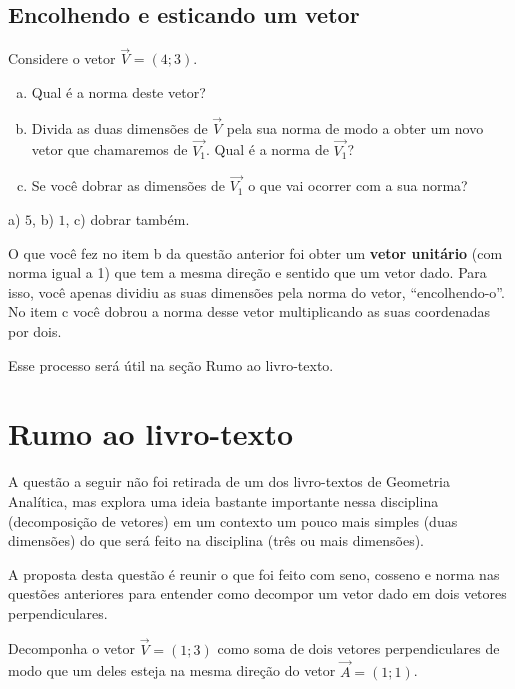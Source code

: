 \documentclass[main.tex]{subfiles}
\begin{document}
\subsection*{Encolhendo e esticando um vetor}

\begin{questao}
Considere o vetor $\overrightarrow{V}=(4;3)$.
\begin{enumerate}[a)]
\item Qual é a norma deste vetor?
\item Divida as duas dimensões de $\overrightarrow{V}$ pela sua norma de modo a obter um novo vetor que chamaremos de $\overrightarrow{V_1}$. Qual é a norma de $\overrightarrow{V_1}$?
\item Se você dobrar as dimensões de $\overrightarrow{V_1}$ o que vai ocorrer com a sua norma?
\end{enumerate}
\end{questao}

\begin{gabarito}
	\begin{gabaritoQuestao}
		a) $5$, b) $1$, c) dobrar também.
	\end{gabaritoQuestao}
\end{gabarito}

O que você fez no item b da questão anterior foi obter um \textbf{vetor unitário} (com norma igual a 1) que tem a mesma direção e sentido que um vetor dado. Para isso, você apenas dividiu as suas dimensões pela norma do vetor, ``encolhendo-o''. No item c você dobrou a norma desse vetor multiplicando as suas coordenadas por dois.

Esse processo será útil na seção Rumo ao livro-texto.

\section{Rumo ao livro-texto}

A questão a seguir não foi retirada de um dos livro-textos de Geometria Analítica, mas explora uma ideia bastante importante nessa disciplina (decomposição de vetores) em um contexto um pouco mais simples (duas dimensões) do que será feito na disciplina (três ou mais dimensões).

A proposta desta questão é reunir o que foi feito com seno, cosseno e norma nas questões anteriores para entender como decompor um vetor dado em dois vetores perpendiculares.

\begin{resolvida}
Decomponha o vetor $\overrightarrow{V}=(1;3)$ como soma de dois vetores perpendiculares de modo que um deles esteja na mesma direção do vetor $\overrightarrow{A}=(1;1)$.
\end{resolvida}
\end{document}
